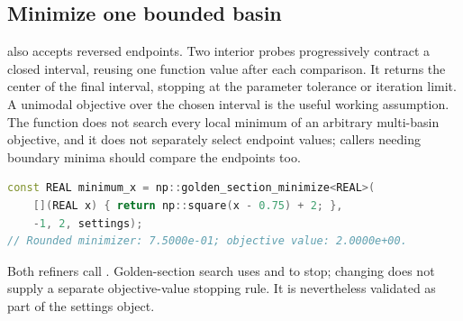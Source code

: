 \subsection{Minimize one bounded basin}

 also
accepts reversed endpoints. Two interior probes progressively contract a
closed interval, reusing one function value after each comparison. It returns
the center of the final interval, stopping at the parameter tolerance or
iteration limit. A unimodal objective over the chosen interval is the useful
working assumption. The function does not search every local minimum of an
arbitrary multi-basin objective, and it does not separately select endpoint
values; callers needing boundary minima should compare the endpoints too.
\par\noindent\begin{minipage}{\linewidth}
\begin{lstlisting}[language=C++]
const REAL minimum_x = np::golden_section_minimize<REAL>(
    [](REAL x) { return np::square(x - 0.75) + 2; },
    -1, 2, settings);
// Rounded minimizer: 7.5000e-01; objective value: 2.0000e+00.
\end{lstlisting}
\end{minipage}\par
Both refiners call . Golden-section search uses
 and  to stop; changing
 does not supply a separate objective-value stopping
rule. It is nevertheless validated as part of the settings object.

